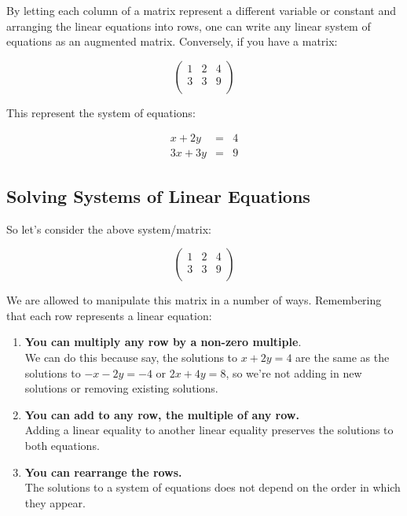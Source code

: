 By letting each column of a matrix represent a different variable or constant and arranging the linear equations into rows, one can write any linear system of equations as an augmented matrix.   Conversely, if you have a matrix:

$$ \left( \begin{array}{rr|r}
1 & 2 & 4\\
3 & 3  & 9\\
\end{array}\right)$$

This represent the system of equations:


\begin{eqnarray*}
x+2y&=&4\\
3x+3y&=&9
\end{eqnarray*}

\subsection{Solving Systems of Linear Equations}

So let's consider the above system/matrix:

$$ \left( \begin{array}{rr|r}
1 & 2 & 4\\
3 & 3  & 9\\
\end{array}\right)$$



We are allowed to manipulate this matrix in a number of ways.  Remembering that each row represents a linear equation:

\begin{enumerate}
\item \textbf{You can multiply any row by a non-zero multiple}.\\ 

We can do this because say, the solutions to $x+2y=4$ are the same as the solutions to $-x-2y=-4$ or $2x+4y=8$, so we're not adding in new solutions or removing existing solutions.

\item \textbf{You can add to any row, the multiple of any row.}\\

Adding a linear equality to another linear equality preserves the solutions to both equations.

\item \textbf{You can rearrange the rows.}\\

The solutions to a system of equations does not depend on the order in which they appear.

\end{enumerate}


